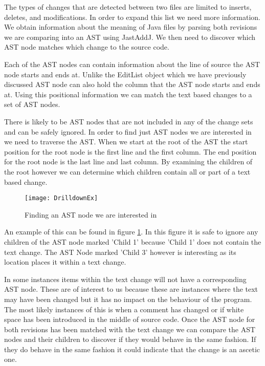 The types of changes that are detected between two files are limited to inserts, deletes, and modifications. In order to expand this list we need more information.  We obtain information about the meaning of Java files by parsing both revisions we are comparing into an AST using JastAddJ. We then need to discover which AST node matches which change to the source code. 

Each of the AST nodes can contain information about the line of source the AST node starts and ends at.  Unlike the EditList object which we have previously discussed AST node can also hold the column that the AST node starts and ends at.  Using this positional information we can match the text based changes to a set of AST nodes.

There is likely to be AST nodes that are not included in any of the change sets and can be safely ignored. In order to find just AST nodes we are interested in we need to traverse the AST.  When we start at the root of the AST the start position for the root node is the first line and the first column. The end position for the root node is the last line and last column.  By examining the children of the root however we can determine which children contain all or part of a text based change.

\begin{figure}[h]
 \begin{center}
  \texttt{[image: DrilldownEx]}
 \end{center}
 \caption{Finding an AST node we are interested in}
 \label{fig:findingASTNode}
\end{figure}  

An example of this can be found in figure \ref{fig:findingASTNode}.  In this figure it is safe to ignore any children of the AST node marked 'Child 1' because 'Child 1' does not contain the text change.  The AST Node marked 'Child 3' however is interesting as its location places it within a text change. 

In some instances items within the text change will not have a corresponding AST node.  These are of interest to us because these are instances where the text may have been changed but it has no impact on the behaviour of the program.  The most likely instances of this is when a comment has changed or if white space has been introduced in the middle of source code. Once the AST node for both revisions has been matched with the text change we can compare the AST nodes and their children to discover if they would behave in the same fashion. If they do behave in the same fashion it could indicate that the change is an ascetic one.

